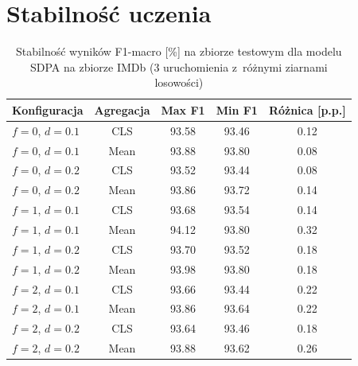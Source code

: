 \documentclass[a4paper,11pt,twoside]{report}
\theoremstyle{definition}
\begin{document}
\section{Stabilność uczenia}\label{app:learning-stability}
\begin{table}[h!]
\centering
\caption{Stabilność wyników F1-macro [\%] na zbiorze testowym dla modelu SDPA na zbiorze IMDb (3 uruchomienia z~różnymi ziarnami losowości)}
\label{tab:sdpa-imdb-seeds}
\small
\smallskip
\begin{tabular}{@{}lcccc@{}}
\toprule
\textbf{Konfiguracja} &
\textbf{Agregacja} &
\textbf{Max F1} &
\textbf{Min F1} &
\textbf{Różnica [p.p.]} \\
\midrule
$f{=}0$, $d{=}0.1$ & CLS  & 93.58 & 93.46 & 0.12 \\
$f{=}0$, $d{=}0.1$ & Mean & 93.88 & 93.80 & 0.08 \\
$f{=}0$, $d{=}0.2$ & CLS  & 93.52 & 93.44 & 0.08 \\
$f{=}0$, $d{=}0.2$ & Mean & 93.86 & 93.72 & 0.14 \\
$f{=}1$, $d{=}0.1$ & CLS  & 93.68 & 93.54 & 0.14 \\
$f{=}1$, $d{=}0.1$ & Mean & 94.12 & 93.80 & 0.32 \\
$f{=}1$, $d{=}0.2$ & CLS  & 93.70 & 93.52 & 0.18 \\
$f{=}1$, $d{=}0.2$ & Mean & 93.98 & 93.80 & 0.18 \\
$f{=}2$, $d{=}0.1$ & CLS  & 93.66 & 93.44 & 0.22 \\
$f{=}2$, $d{=}0.1$ & Mean & 93.86 & 93.64 & 0.22 \\
$f{=}2$, $d{=}0.2$ & CLS  & 93.64 & 93.46 & 0.18 \\
$f{=}2$, $d{=}0.2$ & Mean & 93.88 & 93.62 & 0.26 \\
\bottomrule
\end{tabular}
\end{table}

\FloatBarrier
\setcounter{table}{0}
\end{document}

